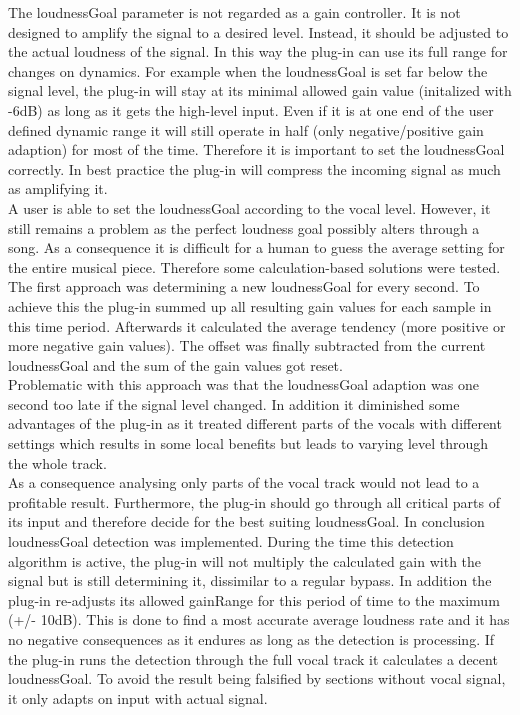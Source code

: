 The loudnessGoal parameter is not regarded as a gain controller. It is not designed to amplify the signal to a desired level. Instead, it should be adjusted to the actual loudness of the signal. In this way the plug-in can use its full range for changes on dynamics. For example when the loudnessGoal is set far below the signal level, the plug-in will stay at its minimal allowed gain value (initalized with -6dB) as long as it gets the high-level input. Even if it is at one end of the user defined dynamic range it will still operate in half (only negative/positive gain adaption) for most of the time. Therefore it is important to set the loudnessGoal correctly. In best practice the plug-in will compress the incoming signal as much as amplifying it.\\
A user is able to set the loudnessGoal according to the vocal level. However, it still remains a problem as the perfect loudness goal possibly alters through a song. As a consequence it is difficult for a human to guess the average setting for the entire musical piece. Therefore some calculation-based solutions were tested.\\
The first approach was determining a new loudnessGoal for every second. To achieve this the plug-in summed up all resulting gain values for each sample in this time period. Afterwards it calculated the average tendency (more positive or more negative gain values). The offset was finally subtracted from the current loudnessGoal and the sum of the gain values got reset.\\
Problematic with this approach was that the loudnessGoal adaption was one second too late if the signal level changed. In addition it diminished some advantages of the plug-in as it treated different parts of the vocals with different settings which results in some local benefits but leads to varying level through the whole track.\\
As a consequence analysing only parts of the vocal track would not lead to a profitable result. Furthermore, the plug-in should go through all critical parts of its input and therefore decide for the best suiting loudnessGoal. In conclusion loudnessGoal detection was implemented. During the time this detection algorithm is active, the plug-in will not multiply the calculated gain with the signal but is still determining it, dissimilar to a regular bypass. In addition the plug-in re-adjusts its allowed gainRange for this period of time to the maximum (+/- 10dB). This is done to find a most accurate average loudness rate and it has no negative consequences as it endures as long as the detection is processing. If the plug-in runs the detection through the full vocal track it calculates a decent loudnessGoal. To avoid the result being falsified by sections without vocal signal, it only adapts on input with actual signal.\\
